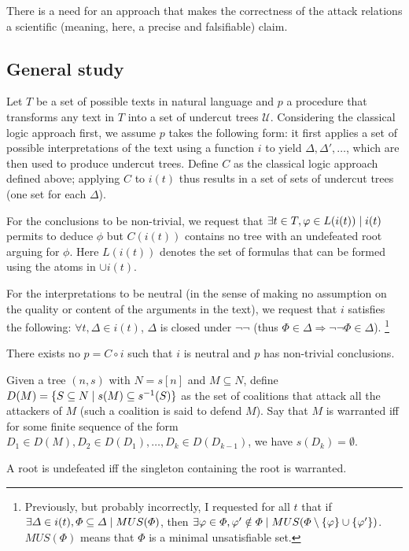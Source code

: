 \documentclass[version=3.21, pagesize, twoside=off, bibliography=totoc, DIV=calc, fontsize=12pt, a4paper, french, english]{scrartcl}
\begin{document}
There is a need for an approach that makes the correctness of the attack relations a scientific (meaning, here, a precise and falsifiable) claim.

\subsection{General study}
Let $T$ be a set of possible texts in natural language and $p$ a procedure that transforms any text in $T$ into a set of undercut trees $\mathcal{U}$. Considering the classical logic approach first, we assume $p$ takes the following form: it first applies a set of possible interpretations of the text using a function $i$ to yield $\Delta, \Delta', …$, which are then used to produce undercut trees. Define $C$ as the classical logic approach defined above; applying $C$ to $i(t)$ thus results in a set of sets of undercut trees (one set for each $\Delta$).

For the conclusions to be non-trivial, we request that $\exists t \in T, \phi \in L(i(t)) \suchthat i(t) $ permits to deduce $\phi$ but $C(i(t))$ contains no tree with an undefeated root arguing for $\phi$. Here $L(i(t))$ denotes the set of formulas that can be formed using the atoms in $\cup i(t)$.

For the interpretations to be neutral (in the sense of making no assumption on the quality or content of the arguments in the text), we request that $i$ satisfies the following: $\forall t, \Delta \in i(t)$, $\Delta$ is closed under $¬¬$ (thus $\Phi \in \Delta ⇒ ¬¬\Phi \in \Delta$).
\footnote{Previously, but probably incorrectly, I requested for all $t$ that if $\exists \Delta \in i(t), \Phi \subseteq \Delta \suchthat MUS(\Phi)$, then $\exists \phi \in \Phi, \phi' \notin \Phi \suchthat MUS(\Phi \setminus \set{\phi} \cup \set{\phi'})$. $MUS(\Phi)$ means that $\Phi$ is a minimal unsatisfiable set.}

\begin{theorem}
	There exists no $p = C \circ i$ such that $i$ is neutral and $p$ has non-trivial conclusions.
\end{theorem}
Given a tree $(n, s)$ with $N = s[n]$ and $M \subseteq N$, define $D(M) = \set{S \subseteq N \suchthat s(M) \subseteq s^{-1}(S)}$ as the set of coalitions that attack all the attackers of $M$ (such a coalition is said to defend $M$). Say that $M$ is warranted iff for some finite sequence of the form $D_1 \in D(M), D_2 \in D(D_1), …, D_k \in D(D_{k - 1})$, we have $s(D_k) = \emptyset$.
\begin{lemma}
	A root is undefeated iff the singleton containing the root is warranted.
\end{lemma}
\end{document}
